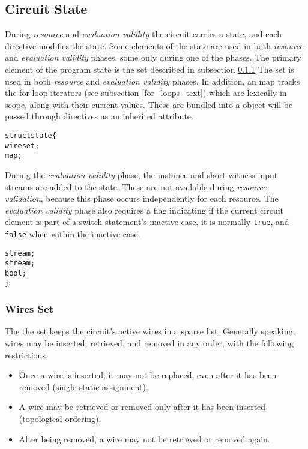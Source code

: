 \subsection{Circuit State}\label{state_text}
During \textit{resource} and \textit{evaluation validity} the circuit carries a state, and each directive modifies the state.
Some elements of the state are used in both \textit{resource} and \textit{evaluation validity} phases, some only during one of the phases.
The primary element of the program state is the  set described in subsection \ref{wireset_text}
The  set is used in both \textit{resource} and \textit{evaluation validity} phases.
In addition, an  map tracks the for-loop iterators (see subsection \ref{for_loops_text}) which are lexically in scope, along with their current values.
These are bundled into a  object will be passed through directives as an inherited attribute.\\

\begin{alltt}\ttSem
  struct state \{
    wireset ;
    map ;
\end{alltt}

During the \textit{evaluation validity} phase, the instance and short witness input streams are added to the state.
These are not available during \textit{resource validation}, because this phase occurs independently for each resource.
The \textit{evaluation validity} phase also requires a flag indicating if the current circuit element is part of a switch statement's inactive case, it is normally \texttt{true}, and \texttt{false} when within the inactive case.\\

\begin{alltt}\ttSem
    stream ;
    stream ;
    bool ;
  \}
\end{alltt}

\subsubsection{Wires Set}\label{wireset_text}

The the  set keeps the circuit's active wires in a sparse list.
Generally speaking, wires may be inserted, retrieved, and removed in any order, with the following restrictions.  
\begin{itemize}
  \item Once a wire is inserted, it may not be replaced, even after it has been removed (single static assignment).
  \item A wire may be retrieved or removed only after it has been inserted (topological ordering).
  \item After being removed, a wire may not be retrieved or removed again.
\end{itemize}

